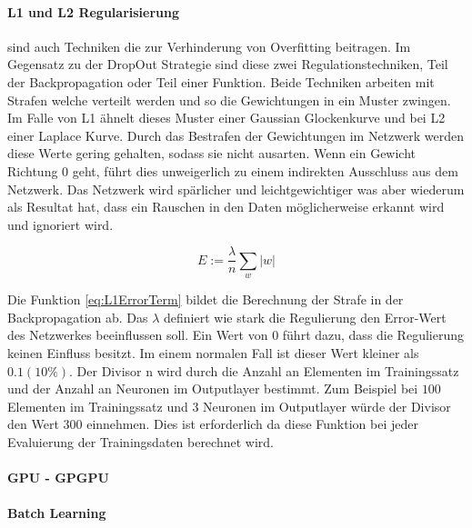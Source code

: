 \paragraph{L1 und L2 Regularisierung} sind auch Techniken die zur Verhinderung von Overfitting beitragen.
Im Gegensatz zu der DropOut Strategie sind diese zwei Regulationstechniken, Teil der Backpropagation oder Teil einer Funktion.
Beide Techniken arbeiten mit Strafen welche verteilt werden und so die Gewichtungen in ein Muster zwingen. 
Im Falle von L1 ähnelt dieses Muster einer Gaussian Glockenkurve und bei L2 einer Laplace Kurve.
Durch das Bestrafen der Gewichtungen im Netzwerk werden diese Werte gering gehalten, sodass sie nicht ausarten. 
Wenn ein Gewicht Richtung $0$ geht, führt dies unweigerlich zu einem indirekten Ausschluss aus dem Netzwerk.
Das Netzwerk wird spärlicher und leichtgewichtiger was aber wiederum als Resultat hat, dass ein Rauschen in den Daten möglicherweise erkannt wird und ignoriert wird.

\begin{equation}
	E := \frac{\lambda}{n} \sum\limits_{w}|w|
	\label{eq:L1ErrorTerm}
\end{equation}

Die Funktion \ref{eq:L1ErrorTerm} bildet die Berechnung der Strafe in der Backpropagation ab.
Das $\lambda$ definiert wie stark die Regulierung den Error-Wert des Netzwerkes beeinflussen soll.
Ein Wert von $0$ führt dazu, dass die Regulierung keinen Einfluss besitzt. 
Im einem normalen Fall ist dieser Wert kleiner als $0.1 (10\%)$.
Der Divisor n wird durch die Anzahl an Elementen im Trainingssatz und der Anzahl an Neuronen im Outputlayer bestimmt.
Zum Beispiel bei $100$ Elementen im Trainingssatz und $3$ Neuronen im Outputlayer würde der Divisor den Wert $300$ einnehmen.
Dies ist erforderlich da diese Funktion bei jeder Evaluierung der Trainingsdaten berechnet wird.

\paragraph{GPU - GPGPU}

\paragraph{Batch Learning}

